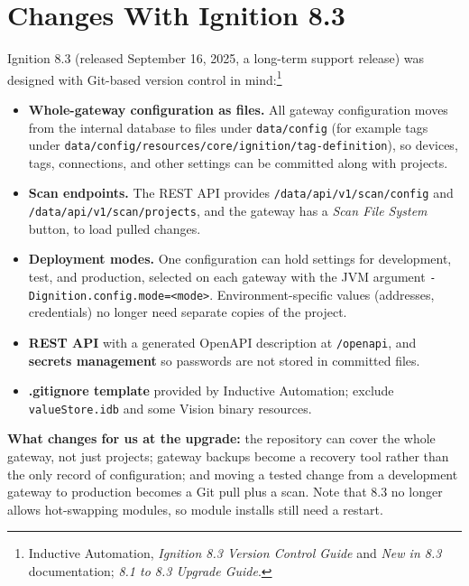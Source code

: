 \section{Changes With Ignition 8.3}
Ignition 8.3 (released September 16, 2025, a long-term support release) was designed with Git-based version control in mind:\footnote{Inductive Automation, \emph{Ignition 8.3 Version Control Guide} and \emph{New in 8.3} documentation; \emph{8.1 to 8.3 Upgrade Guide}.}
\begin{itemize}[itemsep=1pt]
  \item \textbf{Whole-gateway configuration as files.} All gateway configuration moves from the internal database to files under \texttt{data/config} (for example tags under \texttt{data/\allowbreak{}config/\allowbreak{}resources/\allowbreak{}core/\allowbreak{}ignition/\allowbreak{}tag-definition}), so devices, tags, connections, and other settings can be committed along with projects.
  \item \textbf{Scan endpoints.} The REST API provides \texttt{/\allowbreak{}data/\allowbreak{}api/\allowbreak{}v1/\allowbreak{}scan/\allowbreak{}config} and \texttt{/\allowbreak{}data/\allowbreak{}api/\allowbreak{}v1/\allowbreak{}scan/\allowbreak{}projects}, and the gateway has a \textit{Scan File System} button, to load pulled changes.
  \item \textbf{Deployment modes.} One configuration can hold settings for development, test, and production, selected on each gateway with the JVM argument \texttt{-Dignition.\allowbreak{}config.\allowbreak{}mode=<mode>}. Environment-specific values (addresses, credentials) no longer need separate copies of the project.
  \item \textbf{REST API} with a generated OpenAPI description at \texttt{/openapi}, and \textbf{secrets management} so passwords are not stored in committed files.
  \item \textbf{.gitignore template} provided by Inductive Automation; exclude \texttt{valueStore.idb} and some Vision binary resources.
\end{itemize}
\textbf{What changes for us at the upgrade:} the repository can cover the whole gateway, not just projects; gateway backups become a recovery tool rather than the only record of configuration; and moving a tested change from a development gateway to production becomes a Git pull plus a scan. Note that 8.3 no longer allows hot-swapping modules, so module installs still need a restart.

